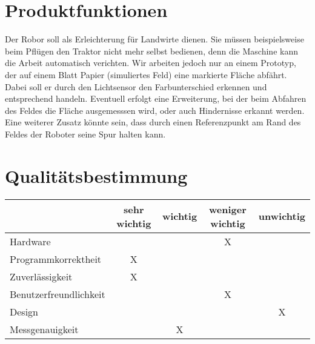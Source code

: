 \documentclass[12pt,a4paper]{article}
\begin{document}
\section{ Produktfunktionen}

Der Robor soll als Erleichterung für Landwirte dienen. Sie müssen beispielsweise beim Pflügen den Traktor nicht mehr selbst bedienen, denn die Maschine kann die Arbeit automatisch verichten.
Wir arbeiten jedoch nur an einem Prototyp, der auf einem Blatt Papier (simuliertes Feld) eine markierte Fläche abfährt. 
Dabei soll er durch den Lichtsensor den Farbunterschied erkennen und entsprechend handeln.
Eventuell erfolgt eine Erweiterung, bei der beim Abfahren des Feldes die Fläche ausgemesssen wird, oder auch Hindernisse erkannt werden.
Eine weiterer Zusatz könnte sein, dass durch einen Referenzpunkt am Rand des Feldes der Roboter seine Spur halten kann.

\section{ Qualitätsbestimmung}

\begin{tabular}{l||c|c|c|c}

 &sehr wichtig & wichtig& weniger wichtig& unwichtig\\
 \hline
 \hline
 Hardware&&& X & \\
 \hline
 Programmkorrektheit& X &  & &\\
 \hline
 Zuverlässigkeit& X &  &  & \\
 \hline
 Benutzerfreundlichkeit& & &X &\\
 \hline
 Design&&&&X\\
 \hline
 Messgenauigkeit&&X&&\\
 
\end{tabular}
\end{document}
